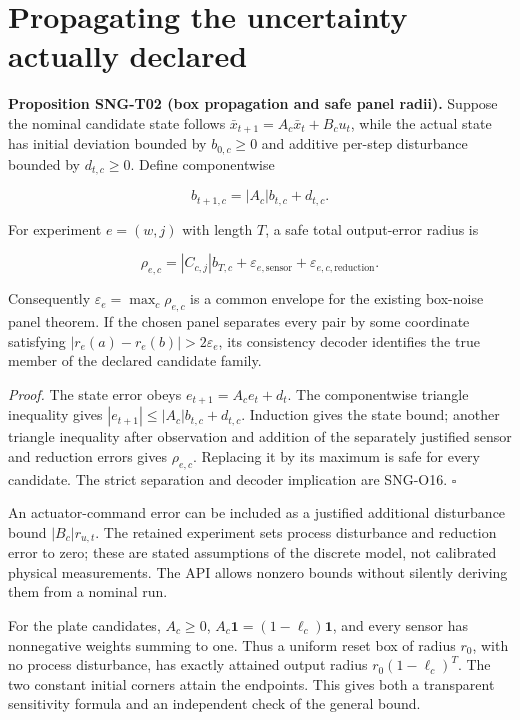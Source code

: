 \documentclass[
  11pt,
  a4paper,
]{report}
\begin{document}
\hypertarget{propagating-the-uncertainty-actually-declared}{%
\section{Propagating the uncertainty actually
declared}\label{propagating-the-uncertainty-actually-declared}}

\textbf{Proposition SNG-T02 (box propagation and safe panel radii).}
Suppose the nominal candidate state follows
\(\bar x_{t+1}=A_c\bar x_t+B_cu_t\), while the actual state has initial
deviation bounded by \(b_{0,c}\ge0\) and additive per-step disturbance
bounded by \(d_{t,c}\ge0\). Define componentwise

\[
b_{t+1,c}=|A_c|b_{t,c}+d_{t,c}.
\]

For experiment \(e=(w,j)\) with length \(T\), a safe total output-error
radius is

\[
\rho_{e,c}=|C_{c,j}|b_{T,c}
 +\varepsilon_{e,\mathrm{sensor}}
 +\varepsilon_{e,c,\mathrm{reduction}}.
\]

Consequently \(\varepsilon_e=\max_c\rho_{e,c}\) is a common envelope for
the existing box-noise panel theorem. If the chosen panel separates
every pair by some coordinate satisfying
\(|r_e(a)-r_e(b)|>2\varepsilon_e\), its consistency decoder identifies
the true member of the declared candidate family.

\emph{Proof.} The state error obeys \(e_{t+1}=A_ce_t+d_t\). The
componentwise triangle inequality gives
\(|e_{t+1}|\le|A_c|b_{t,c}+d_{t,c}\). Induction gives the state bound;
another triangle inequality after observation and addition of the
separately justified sensor and reduction errors gives \(\rho_{e,c}\).
Replacing it by its maximum is safe for every candidate. The strict
separation and decoder implication are SNG-O16. \(\square\)

An actuator-command error can be included as a justified additional
disturbance bound \(|B_c|r_{u,t}\). The retained experiment sets process
disturbance and reduction error to zero; these are stated assumptions of
the discrete model, not calibrated physical measurements. The API allows
nonzero bounds without silently deriving them from a nominal run.

For the plate candidates, \(A_c\ge0\),
\(A_c\mathbf1=(1-\ell_c)\mathbf1\), and every sensor has nonnegative
weights summing to one. Thus a uniform reset box of radius \(r_0\), with
no process disturbance, has exactly attained output radius
\(r_0(1-\ell_c)^T\). The two constant initial corners attain the
endpoints. This gives both a transparent sensitivity formula and an
independent check of the general bound.
\end{document}
